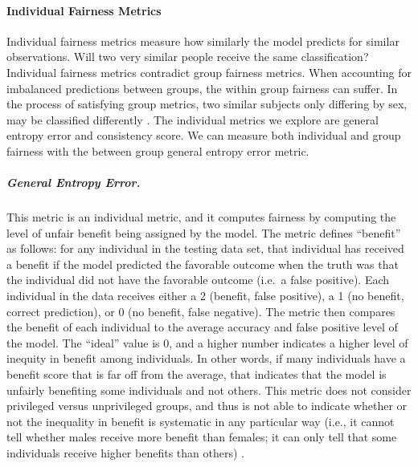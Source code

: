 \documentclass[water,article,submit,moreauthors,pdftex]{mdpi}
\begin{document}
\hypertarget{individual-fairness-metrics}{%
\paragraph{Individual Fairness
Metrics}\label{individual-fairness-metrics}}

Individual fairness metrics measure how similarly the model predicts for
similar observations. Will two very similar people receive the same
classification? Individual fairness metrics contradict group fairness
metrics. When accounting for imbalanced predictions between groups, the
within group fairness can suffer\citep{kypraiou_what_2021}. In the
process of satisfying group metrics, two similar subjects only differing
by sex, may be classified differently
\citep{binns2020apparent, mehrabi2021survey, caton2020fairness, zhou2022bias}.
The individual metrics we explore are general entropy error and
consistency score. We can measure both individual and group fairness
with the between group general entropy error metric.

\hypertarget{general-entropy-error.}{%
\subparagraph{General Entropy Error.}\label{general-entropy-error.}}

This metric is an individual metric, and it computes fairness by
computing the level of unfair benefit being assigned by the model. The
metric defines ``benefit'' as follows: for any individual in the testing
data set, that individual has received a benefit if the model predicted
the favorable outcome when the truth was that the individual did not
have the favorable outcome (i.e.~a false positive). Each individual in
the data receives either a 2 (benefit, false positive), a 1 (no benefit,
correct prediction), or 0 (no benefit, false negative). The metric then
compares the benefit of each individual to the average accuracy and
false positive level of the model. The ``ideal'' value is 0, and a
higher number indicates a higher level of inequity in benefit among
individuals. In other words, if many individuals have a benefit score
that is far off from the average, that indicates that the model is
unfairly benefiting some individuals and not others. This metric does
not consider privileged versus unprivileged groups, and thus is not able
to indicate whether or not the inequality in benefit is systematic in
any particular way (i.e., it cannot tell whether males receive more
benefit than females; it can only tell that some individuals receive
higher benefits than others)
\citep{caton2020fairness, kypraiou_what_2021}.
\end{document}
